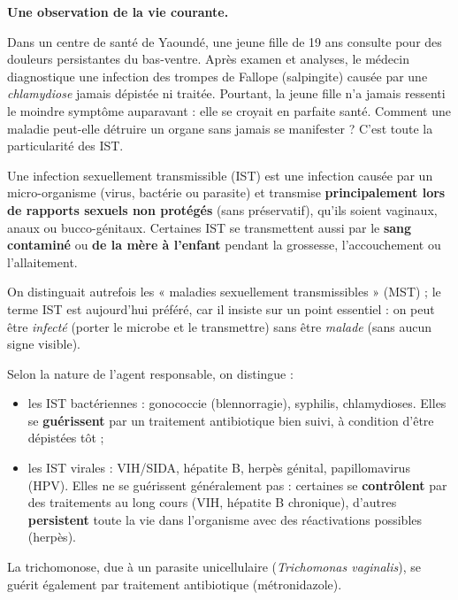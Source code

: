 \documentclass[11pt]{article}
\newcommand{\cle}[1]{{\popxbold\color{popdark}#1}}
\newcounter{popsec}
\newcounter{popsub}
\newcommand{\courssub}[1]{%
  \stepcounter{popsub}%
  \par\vspace{9pt}\noindent{\popxbold\fontsize{11.5}{13}\selectfont\color{popink}{\color{poporange}\thepopsec.\thepopsub}\hspace{6pt}#1}\par\nopagebreak\vspace{4pt}
}
\begin{document}
\courssub{Définition et situation problème}

\textbf{Une observation de la vie courante.}\par
Dans un centre de santé de Yaoundé, une jeune fille de 19 ans consulte pour des douleurs persistantes du bas-ventre. Après examen et analyses, le médecin diagnostique une infection des trompes de Fallope (salpingite) causée par une \emph{chlamydiose} jamais dépistée ni traitée. Pourtant, la jeune fille n'a jamais ressenti le moindre symptôme auparavant : elle se croyait en parfaite santé. Comment une maladie peut-elle détruire un organe sans jamais se manifester ? C'est toute la particularité des IST.

\begin{definition}
Une \cle{infection sexuellement transmissible} (IST) est une infection causée par un micro-organisme (virus, bactérie ou parasite) et transmise \textbf{principalement lors de rapports sexuels non protégés} (sans préservatif), qu'ils soient vaginaux, anaux ou bucco-génitaux. Certaines IST se transmettent aussi par le \textbf{sang contaminé} ou \textbf{de la mère à l'enfant} pendant la grossesse, l'accouchement ou l'allaitement.
\end{definition}

On distinguait autrefois les « maladies sexuellement transmissibles » (MST) ; le terme IST est aujourd'hui préféré, car il insiste sur un point essentiel : on peut être \emph{infecté} (porter le microbe et le transmettre) sans être \emph{malade} (sans aucun signe visible).

\begin{propriete}
Selon la nature de l'agent responsable, on distingue :
\begin{itemize}
\item les \cle{IST bactériennes} : gonococcie (blennorragie), syphilis, chlamydioses. Elles se \textbf{guérissent} par un traitement antibiotique bien suivi, à condition d'être dépistées tôt ;
\item les \cle{IST virales} : VIH/SIDA, hépatite B, herpès génital, papillomavirus (HPV). Elles ne se guérissent généralement pas : certaines se \textbf{contrôlent} par des traitements au long cours (VIH, hépatite B chronique), d'autres \textbf{persistent} toute la vie dans l'organisme avec des réactivations possibles (herpès).
\end{itemize}
La trichomonose, due à un parasite unicellulaire (\emph{Trichomonas vaginalis}), se guérit également par traitement antibiotique (métronidazole).
\end{propriete}
\end{document}
